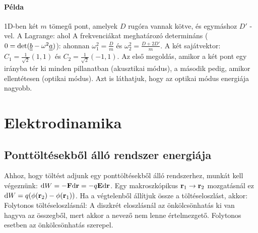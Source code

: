    \paragraph{Példa}
    
    1D-ben két $m$ tömegű pont, amelyek $D$ rugóra vannak kötve, és egymáshoz $D'$ -vel. A Lagrange:
    ahol 
    A frekvenciákat meghatározó determináns ($0=\det(\underline{\underline{b}}-\omega^2\underline{\underline{a}})$):
    ahonnan $\omega_1^2=\frac{D}{m}$ és $\omega_2^2=\frac{D+2D'}{m}$. A két sajátvektor: $C_1=\frac{1}{\sqrt{2}}\left(1,1\right)$ és $C_2=\frac{1}{\sqrt{2}}\left(-1,1\right)$. Az első megoldás, amikor a két pont egy irányba tér ki minden pillanatban (akusztikai módus), a második pedig, amikor ellentétesen (optikai módus). Azt is láthatjuk, hogy az optikai módus energiája nagyobb.
    
 \section{Elektrodinamika}
  
  \subsection{Ponttöltésekből álló rendszer energiája}
   
   Ahhoz, hogy töltést adjunk egy ponttöltésekből álló rendszerhez, munkát kell végeznünk: $\mathrm{d} W=-\mathbf{F} \mathrm{d} \mathbf{r}=-q\mathbf{E}\mathrm{d}\mathbf{r}$. Egy makroszkópikus $\mathbf{r}_1\to\mathbf{r}_2$ mozgatásnál ez $\mathrm{d} W=q(\phi(\mathbf{r}_2)-\phi(\mathbf{r}_1))$. Ha a végtelenből állítjuk össze a töltéseloszlást, akkor:
   Folytonos töltéseloszlásnál:
   A diszkrét eloszlásnál az önkölcsönhatás ki van hagyva az összegből, mert akkor a nevező nem lenne értelmezgető. Folytonos esetben az önkölcsönhatás szerepel.
   
